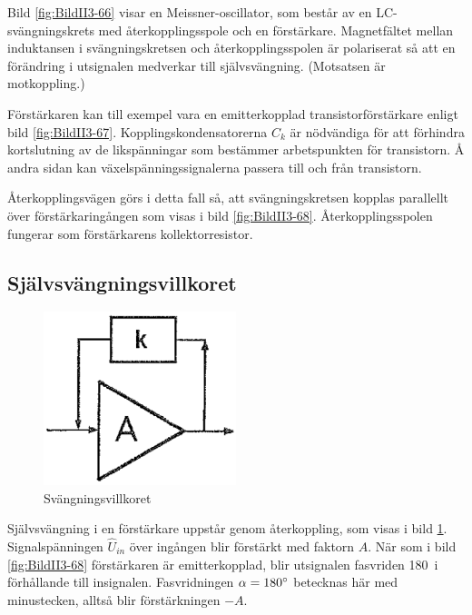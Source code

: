 Bild \ref{fig:BildII3-66} visar en Meissner-oscillator, som består av en
LC-svängningskrets med återkopplingsspole och en förstärkare.
Magnetfältet mellan induktansen i svängningskretsen och återkopplingsspolen är
polariserat så att en förändring i utsignalen medverkar till självsvängning.
(Motsatsen är motkoppling.)

Förstärkaren kan till exempel vara en emitterkopplad transistorförstärkare enligt bild
\ref{fig:BildII3-67}.
Kopplingskondensatorerna \(C_k\) är nödvändiga för att förhindra kortslutning
av de likspänningar som bestämmer arbetspunkten för transistorn.
Å andra sidan kan växelspänningssignalerna passera till och från transistorn.

Återkopplingsvägen görs i detta fall så, att svängningskretsen kopplas
parallellt över förstärkaringången som visas i bild \ref{fig:BildII3-68}.
Återkopplingsspolen fungerar som förstärkarens kollektorresistor.

\subsection{Självsvängningsvillkoret}

\begin{figure}
\includegraphics[width=0.5\textwidth]{images/cropped_pdfs/bild_2_3-69.pdf}
\caption{Svängningsvillkoret}
\label{fig:BildII3-69}
\end{figure}

Självsvängning i en förstärkare uppstår genom återkoppling, som visas i
bild \ref{fig:BildII3-69}.
Signalspänningen \(\hat{U}_{in}\) över ingången blir
förstärkt med faktorn \(A\). När som i bild \ref{fig:BildII3-68} förstärkaren är
emitterkopplad, blir utsignalen fasvriden 180\degree~i förhållande till
insignalen.
Fasvridningen \(\alpha=180\degree\) betecknas här med minustecken, alltså blir
förstärkningen \(-A\).

